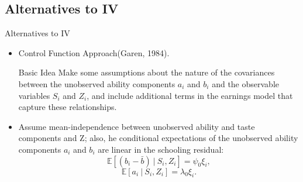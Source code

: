 \documentclass{beamer}
\begin{document}
\subsection{Alternatives to IV}
\begin{frame}{Alternatives to IV}
    \begin{itemize}
        \item Control Function Approach(Garen, 1984).
        \begin{block}{Basic Idea}
        Make some assumptions about the nature of the covariances between the unobserved ability components $a_{i}$ and $b_{i}$ and the observable variables $S_{i}$ and $Z_{i}$, and include additional terms in the earnings model that capture these relationships.
        \end{block}
        
        \item Assume mean-independence between unobserved ability and taste components and Z; also, he conditional expectations of the unobserved ability components $a_{i}$ and $b_{i}$ are linear in the schooling residual:
        \begin{equation}\tag{8a}
           \mathbb{E}[(b_{i}-\bar{b})~|~S_{i},Z_{i}]= \psi_{0}\xi_{i}, 
        \end{equation}
        \begin{equation}\tag{8b}
           \mathbb{E}[a_{i}~|~S_{i},Z_{i}]= \lambda_{0}\xi_{i}. 
        \end{equation}
    \end{itemize}
\end{frame}
\end{document}
